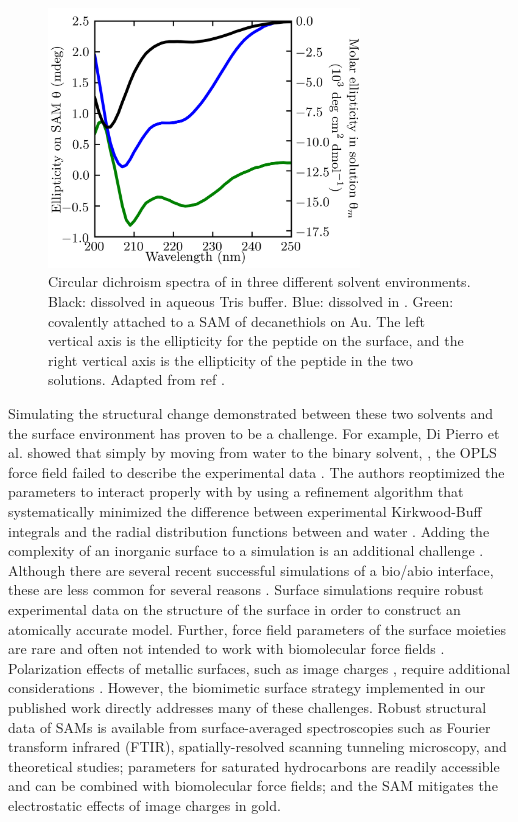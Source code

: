 \begin{figure}  
    \center
    \includegraphics[width=3.25in]{figures-helix/nachos_cd_spectra.png}
    \caption{
        Circular dichroism spectra of \pep{} in three different solvent environments. 
        Black: \pep{} dissolved in aqueous Tris buffer. 
        Blue: \pep{} dissolved in \tbawat{}. 
        Green: \pep{} covalently attached to a SAM of decanethiols on Au. 
        The left vertical axis is the ellipticity for the peptide on the surface, and the right vertical axis is the ellipticity of the peptide in the two solutions. 
        Adapted from ref .
    }
    \label{fig:helix-cd_spectra}
\end{figure}

Simulating the structural change demonstrated between these two solvents and the surface environment has proven to be a challenge. 
For example, Di Pierro et al. showed that simply by moving from water to the binary solvent, \tbawat{}, the OPLS force field failed to describe the experimental data \cite{DiPierro2015}.   
The authors reoptimized the \tba{} parameters to interact properly with  by using a refinement algorithm that systematically minimized the difference between experimental Kirkwood-Buff integrals and the radial distribution functions between \tba{} and water \cite{DiPierro2015}. 
Adding the complexity of an inorganic surface to a simulation is an additional challenge \cite{Walsh2017}. 
Although there are several recent successful simulations of a bio/abio interface, these are less common for several reasons \cite{Gianese2009, Meibner2014, Zerze2015, Cannon2015, Krause2017, Prakash2018a, Prakash2018, Sprenger2018}.
Surface simulations require robust experimental data on the structure of the surface in order to construct an atomically accurate model. 
Further, force field parameters of the surface moieties are rare and often not intended to work with biomolecular force fields \cite{Latour2008, Latour2014}.
Polarization effects of metallic surfaces, such as image charges \cite{Heinz2011}, require additional considerations \cite{Iori2009}. 
However, the biomimetic surface strategy implemented in our published work directly addresses many of these challenges. 
Robust structural data of SAMs is available from surface-averaged spectroscopies such as Fourier transform infrared (FTIR), spatially-resolved scanning tunneling microscopy, and theoretical studies; 
parameters for saturated hydrocarbons are readily accessible and can be combined with biomolecular force fields; 
and the SAM mitigates the electrostatic effects of image charges in gold.

